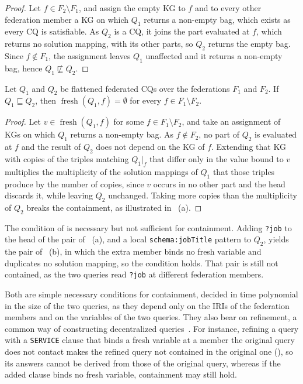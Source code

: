 \documentclass[../main]{subfiles}
\begin{document}
\begin{proof}
  Let $f \in F_2 \setminus F_1$, and assign the empty \ac{KG} to $f$ and to every other federation member a \ac{KG} on which $Q_1$ returns a non-empty bag, which exists as every \ac{CQ} is satisfiable.
  As $Q_2$ is a \ac{CQ}, it joins the part evaluated at $f$, which returns no solution mapping, with its other parts, so $Q_2$ returns the empty bag.
  Since $f \notin F_1$, the assignment leaves $Q_1$ unaffected and it returns a non-empty bag, hence $Q_1 \not\sqsubseteq Q_2$.
\end{proof}

\begin{proposition}\label{prop_fed_extra_member}
  Let $Q_1$ and $Q_2$ be flattened federated \acp{CQ} over the federations $F_1$ and $F_2$.
  If $Q_1 \sqsubseteq Q_2$, then $\operatorname{fresh}(Q_1, f) = \emptyset$ for every $f \in F_1 \setminus F_2$.
\end{proposition}

\begin{proof}
  Let $v \in \operatorname{fresh}(Q_1, f)$ for some $f \in F_1 \setminus F_2$, and take an assignment of \acp{KG} on which $Q_1$ returns a non-empty bag.
  As $f \notin F_2$, no part of $Q_2$ is evaluated at $f$ and the result of $Q_2$ does not depend on the \ac{KG} of $f$.
  Extending that \ac{KG} with copies of the triples matching $Q_1|_f$ that differ only in the value bound to $v$ multiplies the multiplicity of the solution mappings of $Q_1$ that those triples produce by the number of copies, since $v$ occurs in no other part and the head discards it, while leaving $Q_2$ unchanged.
  Taking more copies than the multiplicity of $Q_2$ breaks the containment, as illustrated in ~(a).
\end{proof}

The condition of  is necessary but not sufficient for containment.
Adding \texttt{?job} to the head of the pair of ~(a), and a local \texttt{schema:jobTitle} pattern to $Q_2$, yields the pair of ~(b), in which the extra member binds no fresh variable and duplicates no solution mapping, so the condition holds.
That pair is still not contained, as the two queries read \texttt{?job} at different federation members.

Both are simple necessary conditions for containment, decided in time polynomial in the size of the two queries, as they depend only on the \acp{IRI} of the federation members and on the variables of the two queries.
They also bear on refinement, a common way of constructing decentralized queries~\cite{eschauzier2026solidsessionbench}.
For instance, refining a query with a \texttt{SERVICE} clause that binds a fresh variable at a member the original query does not contact makes the refined query not contained in the original one (), so its answers cannot be derived from those of the original query, whereas if the added clause binds no fresh variable, containment may still hold.
\end{document}
